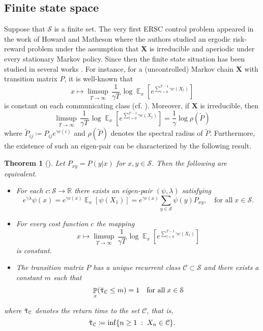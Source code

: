 \documentclass[notitlepage,11pt,reqno]{amsart}
\numberwithin{equation}{section}
\theoremstyle{plain}
\newtheorem{theorem}{Theorem}[section]
\theoremstyle{definition}
\theoremstyle{remark}
\newcommand{\uuptau}{{\Breve{\uptau}}}
\newcommand{\cS}{{\mathcal{S}}}     %
\newcommand{\RR}{\mathds{R}} %
\DeclareMathOperator{\Exp}{\mathbb{E}} %
\DeclareMathOperator{\Prob}{\mathbb{P}} %
\newcommand{\df}{\coloneqq}
\begin{document}
\subsection{Finite state space}
Suppose that $\cS$ is a finite set. The very first  ERSC control problem appeared in the work of Howard and Matheson \cite{Howard-71} where the authors studied an ergodic risk-reward problem
under the assumption that $\textbf{X}$ is irreducible and aperiodic under every stationary Markov policy. 
Since then the finite state situation has been studied in several works 
\cite{BCF98,MR3639105,MR2115041,MR2510639,MR2799396,MR2558431,MR2115041,MR1893292,Fleming-99,MR736636,MR2932929,MR1690565}. For instance, for a
(uncontrolled) Markov chain $\textbf{X}$ with transition matrix $P$, it is well-known that
$$x\mapsto \limsup_{ T\to\infty} \, \frac{1}{\gamma T}\,
\log \Exp_x \left[e^{\sum_{t = 0}^{T-1} \gamma c(X_t)}\right]$$
is constant on each communicating class (cf. \cite[Lemma~1]{BCF98}). Moreover, if  $\textbf{X}$ is irreducible, then 
$$\limsup_{ T\to\infty} \, \frac{1}{\gamma T}\,
\log \Exp_x \left[e^{\sum_{t = 0}^{T-1} \gamma c(X_t)}\right]= \frac{1}{\gamma} \log \rho(\tilde{P})$$
where $\tilde{P}_{ij}\df P_{ij} e^{\gamma c(i)}$ and $ \rho(\tilde{P})$ denotes the spectral radius of $\tilde{P}$. Furthermore, the existence of such an eigen-pair can be characterized by the following result.
\begin{theorem}[\cite{MR2510639}]
Let $P_{xy}=P(y|x)$ for $x, y\in\cS$. Then the following are equivalent.
\begin{itemize}
\item[(i)] For each $c:\cS\to \RR$ there exists an eigen-pair $(\psi, \lambda)$ satisfying
$$e^{\gamma\lambda} \psi(x)= e^{\gamma c(x)} \Exp_x[\psi(X_1)]=e^{\gamma c(x)} \sum_{y\in\cS} \psi(y) P_{xy}, \quad \text{for all}\; x\in\cS.$$ 
\item[(ii)] For every cost function $c$ the mapping
$$x\mapsto \limsup_{ T\to\infty} \, \frac{1}{\gamma T}\,
\log \Exp_x \left[e^{\sum_{t = 0}^{T-1} \gamma c(X_t)}\right]$$
is constant.
\item[(iii)] The transition matrix $P$ has a unique recurrent class $\mathcal{C}\subset\cS$ and there exists a constant $m$ such that
$$\Prob_x(\uuptau_{\mathcal{C}}\leq m)=1\quad \text{for all}\; x\in\cS$$
\end{itemize}
where $\uuptau_{\mathcal{C}}$ denotes the return time to the set $\mathcal{C}$, that is, 
$$\uuptau_{\mathcal{C}}\df \inf\{n\geq 1\; :\; X_n\in\mathcal{C}\}.$$
\end{theorem}
\end{document}
